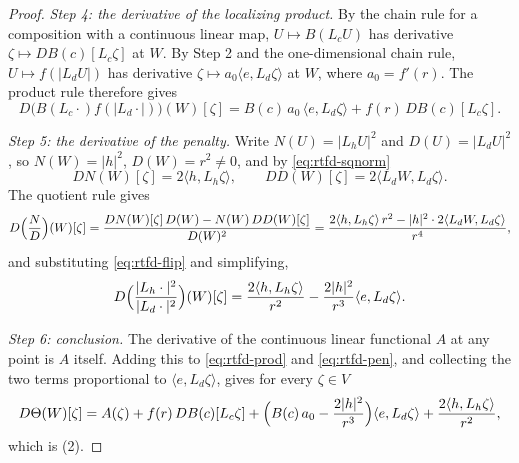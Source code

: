 \begin{proof}
\emph{Step 4: the derivative of the localizing product.} By the chain rule for a
composition with a continuous linear map, $U\mapsto B(L_cU)$ has derivative
$\zeta\mapsto DB(c)[L_c\zeta]$ at $W$. By Step 2 and the one-dimensional chain
rule, $U\mapsto f(|L_dU|)$ has derivative
$\zeta\mapsto a_0\langle e,L_d\zeta\rangle$ at $W$, where $a_0=f'(r)$. The
product rule therefore gives
\begin{equation}\label{eq:rtfd-prod}
  D\bigl(B(L_c\cdot)f(|L_d\cdot|)\bigr)(W)[\zeta]
   =B(c)\,a_0\,\langle e,L_d\zeta\rangle+f(r)\,DB(c)[L_c\zeta].
\end{equation}

\emph{Step 5: the derivative of the penalty.} Write $N(U)=|L_hU|^2$ and
$D(U)=|L_dU|^2$, so $N(W)=|h|^2$, $D(W)=r^2\ne0$, and by
\eqref{eq:rtfd-sqnorm}
\[
  DN(W)[\zeta]=2\langle h,L_h\zeta\rangle,\qquad
  DD(W)[\zeta]=2\langle L_dW,L_d\zeta\rangle .
\]
The quotient rule gives
\[
  D\Bigl(\frac ND\Bigr)(W)[\zeta]
   =\frac{DN(W)[\zeta]\,D(W)-N(W)\,DD(W)[\zeta]}{D(W)^2}
   =\frac{2\langle h,L_h\zeta\rangle\,r^2
      -|h|^2\cdot2\langle L_dW,L_d\zeta\rangle}{r^4},
\]
and substituting \eqref{eq:rtfd-flip} and simplifying,
\begin{equation}\label{eq:rtfd-pen}
  D\Bigl(\frac{|L_h\cdot|^2}{|L_d\cdot|^2}\Bigr)(W)[\zeta]
   =\frac{2\langle h,L_h\zeta\rangle}{r^2}
     -\frac{2|h|^2}{r^3}\langle e,L_d\zeta\rangle .
\end{equation}

\emph{Step 6: conclusion.} The derivative of the continuous linear functional
$A$ at any point is $A$ itself. Adding this to \eqref{eq:rtfd-prod} and
\eqref{eq:rtfd-pen}, and collecting the two terms proportional to
$\langle e,L_d\zeta\rangle$, gives for every $\zeta\in V$
\[
  D\Theta(W)[\zeta]
   =A(\zeta)+f(r)\,DB(c)[L_c\zeta]
     +\Bigl(B(c)\,a_0-\frac{2|h|^2}{r^3}\Bigr)\langle e,L_d\zeta\rangle
     +\frac{2\langle h,L_h\zeta\rangle}{r^2},
\]
which is (2).
\end{proof}
